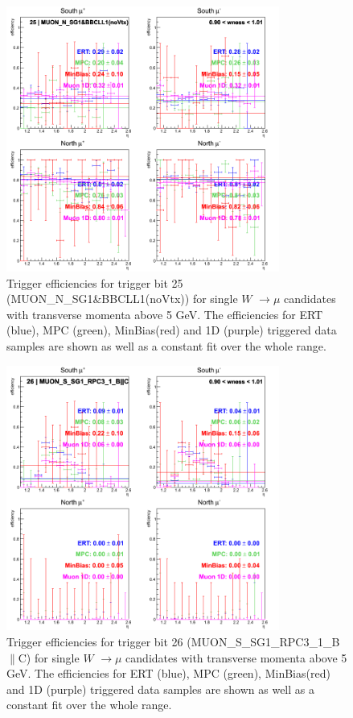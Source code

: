 \clearpage
\begin{figure}[h!]

  \centering

  \includegraphics[width=0.8\textwidth]{./figures/run13_trigeffieta_w1_trig25_lin.png}
  \caption{\label{fig:run13_trigeffieta_w0_nper0_trig25_lin} Trigger efficiencies for trigger bit 25 (MUON\_N\_SG1\&BBCLL1(noVtx)) for single $W$ $\rightarrow \mu$ candidates with transverse momenta above 5 GeV. The efficiencies for ERT (blue), MPC (green), MinBias(red) and 1D (purple) triggered data samples are shown as well as a constant fit over the whole range.}

\end{figure}
\clearpage
\begin{figure}[h!]

  \centering

  \includegraphics[width=0.8\textwidth]{./figures/run13_trigeffieta_w1_trig26_lin.png}
  \caption{\label{fig:run13_trigeffieta_w0_nper0_trig26_lin} Trigger efficiencies for trigger bit 26 (MUON\_S\_SG1\_RPC3\_1\_B$\|$C) for single $W$ $\rightarrow \mu$ candidates with transverse momenta above 5 GeV. The efficiencies for ERT (blue), MPC (green), MinBias(red) and 1D (purple) triggered data samples are shown as well as a constant fit over the whole range.}

\end{figure}
